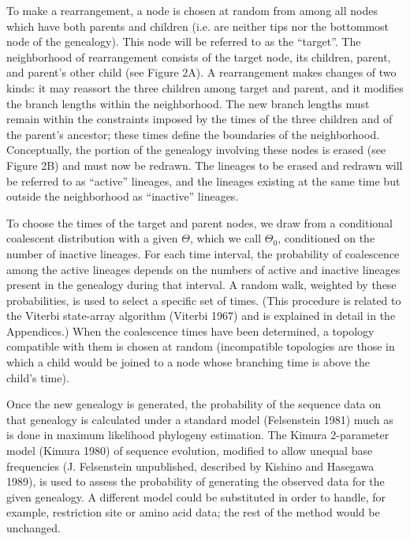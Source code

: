 \documentclass[12pt]{article}
\begin{document}
To make a rearrangement, a node is chosen at random from among all nodes 
which have both parents and children (i.e. are neither tips nor the
bottommost node of the genealogy).  This node will be referred to as the
``target''.  The neighborhood of rearrangement consists of the target node,
 its children,
parent, and parent's other child (see Figure 2A).  A rearrangement makes 
changes of two kinds:  it may reassort the three children among target and
parent, and it modifies the branch lengths within the neighborhood.
The new branch lengths must remain within the constraints imposed by the times
of the three children and of the parent's ancestor; these times define
the boundaries of the neighborhood.
Conceptually, the portion of the genealogy involving these nodes is erased
(see Figure 2B) and must now be redrawn.  The lineages to be erased and
redrawn will be referred to as ``active'' lineages, and the lineages existing
at the same time but outside the
neighborhood as ``inactive'' lineages.

To choose the times of the target and parent nodes, we draw from a
conditional coalescent
distribution with a given $\Theta$, which we call $\Theta_{0}$,
conditioned on the number of inactive lineages.  For
each time interval, the probability of coalescence among the active
lineages
depends on the numbers of active and inactive lineages present in the
genealogy during that interval.  A random walk, weighted by these
probabilities, is used to select a specific set of
times.  (This procedure is related to the Viterbi state-array algorithm
({\sc Viterbi} 1967) and is explained in detail in the Appendices.)
When the coalescence times have been determined, a topology compatible with
them is chosen at random (incompatible topologies are those in
which a child would be joined to a node whose branching time is above
the child's time).

Once the new genealogy is generated, the probability of the sequence
data on that genealogy is calculated under a
standard model ({\sc Felsenstein} 1981) much as is done in maximum likelihood
phylogeny estimation.  The Kimura
2-parameter model ({\sc Kimura} 1980) of sequence evolution, modified to 
allow unequal base frequencies ({\sc J. Felsenstein} unpublished,
described by {\sc Kishino} and {\sc Hasegawa} 1989),
is used to assess the probability of generating the observed data for
the given genealogy.  A different model could be
substituted in order to handle, for example, restriction site or amino
acid data; the rest of the method would be unchanged.
\end{document}

